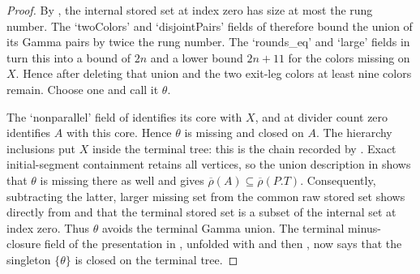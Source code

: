 \begin{proof}
By , the internal stored set
at index zero has size at most the rung number.  The `twoColors' and
`disjointPairs' fields of  therefore bound the
union of its Gamma pairs by twice the rung number.  The `rounds_eq' and
`large' fields in  turn this into a
bound of $2n$ and a lower bound $2n+11$ for the colors missing on $X$.
Hence after deleting that union and the two exit-leg colors at least
nine colors remain.  Choose one and call it $\theta$.

The `nonparallel' field of  identifies its core
with $X$, and at divider count zero
 identifies $A$ with this core.  Hence
$\theta$ is missing and closed on $A$.  The hierarchy inclusions put
$X$ inside the terminal tree: this is the chain recorded by
.  Exact initial-segment containment retains
all vertices, so the union description in 
shows that $\theta$ is missing there as well and gives
$\overline\rho(A)\subseteq\overline\rho(P.T)$.  Consequently,
subtracting the latter, larger missing set from the common raw stored set
shows directly from
 and
 that the terminal stored set is a
subset of the internal set at index zero.  Thus $\theta$ avoids the
terminal Gamma union.  The terminal minus-closure field of the
presentation in , unfolded with
 and then
, now says that the singleton $\{\theta\}$
is closed on the terminal tree.
\end{proof}
